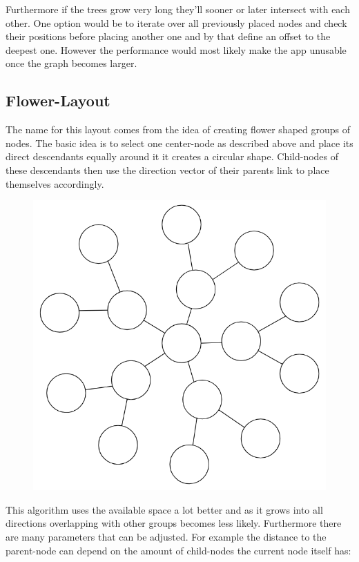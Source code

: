 Furthermore if the trees grow very long they'll sooner or later intersect with each other. One option would be to iterate over all previously placed nodes and check their positions before placing another one and by that define an offset to the deepest one. However the performance would most likely make the app unusable once the graph becomes larger.

\subsection{Flower-Layout}
The name for this layout comes from the idea of creating flower shaped groups of nodes. The basic idea is to select one center-node as described above and place its direct descendants equally around it it creates a circular shape. Child-nodes of these descendants then use the direction vector of their parents link to place themselves accordingly.

\begin{figure}[H]
\label{ex:TreeBad}
\centering
\includegraphics[scale=.55]{Bilder/FlowerEx.png}
\end{figure}

This algorithm uses the available space a lot better and as it grows into all directions overlapping with other groups becomes less likely. Furthermore there are many parameters that can be adjusted. For example the distance to the parent-node can depend on the amount of child-nodes the current node itself has:

